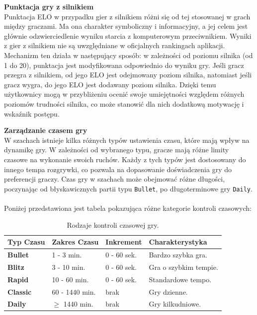 \documentclass[12pt,a4paper]{article}
\begin{document}
\noindent \textbf{Punktacja gry z silnikiem}\\
Punktacja ELO w przypadku gier z silnikiem różni się od tej stosowanej w grach między graczami. Ma ona charakter symboliczny i informacyjny, a jej celem jest głównie odzwierciedlenie wyniku starcia z komputerowym przeciwnikiem. Wyniki z gier z silnikiem nie są uwzględniane w oficjalnych rankingach aplikacji. Mechanizm ten działa w następujący sposób: w zależności od poziomu silnika (od 1 do 20), punktacja jest modyfikowana odpowiednio do wyniku gry. Jeśli gracz przegra z silnikiem, od jego ELO jest odejmowany poziom silnika, natomiast jeśli gracz wygra, do jego ELO jest dodawany poziom silnika. Dzięki temu użytkownicy mogą w przybliżeniu ocenić swoje umiejętności względem różnych poziomów trudności silnika, co może stanowić dla nich dodatkową motywację i wskaźnik postępu.

\newpage

\noindent \textbf{Zarządzanie czasem gry}\\
W szachach istnieje kilka różnych typów ustawienia czasu, które mają wpływ na dynamikę gry. W zależności od wybranego typu, gracze mają różne limity czasowe na wykonanie swoich ruchów. Każdy z tych typów jest dostosowany do innego tempa rozgrywki, co pozwala na dopasowanie doświadczenia gry do preferencji graczy. Czas gry w szachach może obejmować różne długości, poczynając od błyskawicznych partii typu \texttt{Bullet}, po długoterminowe gry \texttt{Daily}.
\\\\
Poniżej przedstawiona jest tabela pokazująca różne kategorie kontroli czasowych:

\renewcommand{\arraystretch}{1.5}
\begin{table}[h!]
    \centering
    \begin{tabular}{|l|m{3cm}|m{3cm}|m{5cm}|}
        \hline
        \rowcolor{lightgray}
        \textbf{Typ Czasu} & \textbf{Zakres Czasu} & \textbf{Inkrement} & \textbf{Charakterystyka} \\ \hline
        \textbf{Bullet} & 1 - 3 min. & 0 - 60 sek. & Bardzo szybka gra. \\ \hline
        \textbf{Blitz} & 3 - 10 min. & 0 - 60 sek. & Gra o szybkim tempie. \\ \hline
        \textbf{Rapid} & 10 - 60 min. & 0 - 60 sek. & Standardowe tempo. \\ \hline
        \textbf{Classic} & 60 - 1440 min. & brak & Gry dzienne. \\ \hline
        \textbf{Daily} & $\geq$ 1440 min. & brak & Gry kilkudniowe. \\ \hline
    \end{tabular}
    \caption{Rodzaje kontroli czasowej gry.}
\end{table}
\vspace{0.5cm}
\end{document}
